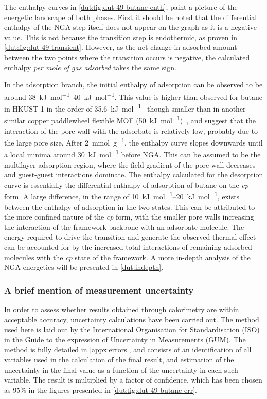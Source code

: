 The enthalpy curves in \autoref{dut:fig:dut-49-butane-enth},
paint a picture of the energetic landscape of both phases.
First it should be noted that the differential enthalpy of
the NGA step itself does not appear on the graph as it is a
negative value. This is not because the transition step is 
endothermic, as proven in \autoref{dut:fig:dut-49-transient}. 
However, as the net change in adsorbed amount between the two
points where the transition occurs is negative, the calculated
enthalpy \textit{per mole of gas adsorbed} takes the same sign.

In the adsorption branch, the initial enthalpy of adsorption 
can be observed to be around \SIrange{38}{40}{\kilo\joule\per\mol}.
This value is higher than observed for butane in HKUST-1 in the 
order of \SI{35.6}{\kilo\joule\per\mol}~\cite{farrussengHeatsAdsorptionSeven2009} 
though smaller than in another similar copper paddlewheel flexible MOF 
(\SI{50}{\kilo\joule\per\mol})~\cite{langeStructuralFlexibilityCopperbased2014},
and suggest that the interaction of the pore wall with the adsorbate is 
relatively low, probably due to the large pore size. 
After \SI{2}{\milli\mol\per\gram}, the enthalpy
curve slopes downwards until a local minima around 
\SI{30}{\kilo\joule\per\mol} before NGA. 
This can be assumed to be the multilayer adsorption region,
where the field gradient of the pore wall decreases and guest-guest 
interactions dominate.
The enthalpy calculated for the desorption curve is essentially the 
differential enthalpy of adsorption of butane on the \textit{cp} form.
A large difference, in the range of 
\SIrange{10}{20}{\kilo\joule\per\mol}, exists
between the enthalpy of adsorption in the two states. This can be 
attributed to the more confined nature of the \textit{cp} form, with the
smaller pore walls increasing the interaction of the framework backbone
with an adsorbate molecule. The energy required to drive the 
transition and generate the observed thermal effect can be accounted 
for by the increased total interactions of remaining adsorbed 
molecules with the \textit{cp} state of the framework.
A more in-depth analysis of the NGA energetics will be presented 
in \autoref{dut:indepth}.

\subsubsection{A brief mention of measurement uncertainty}

In order to assess whether results obtained through calorimetry
are within acceptable accuracy, uncertainty calculations have been
carried out. The method used here is laid out by the International 
Organisation for Standardisation (ISO) in the Guide to the expression
of Uncertainty in Measurements (GUM). The method is fully detailed 
in \autoref{appx:errors}, and consists of an identification of 
all variables used in the calculation of the final result, and 
estimation of the uncertainty in the final value as a function of
the uncertainty in each such variable. The result is multiplied
by a factor of confidence, which has been chosen as 95\% in the 
figures presented in \autoref{dut:fig:dut-49-butane-err}.


